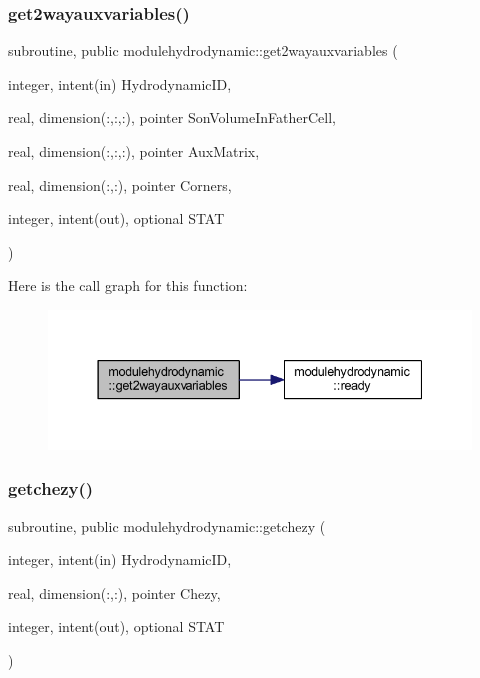 \subsubsection{\texorpdfstring{get2wayauxvariables()}{get2wayauxvariables()}}
{\footnotesize\ttfamily subroutine, public modulehydrodynamic\+::get2wayauxvariables (\begin{DoxyParamCaption}\item[{integer, intent(in)}]{Hydrodynamic\+ID,  }\item[{real, dimension(\+:,\+:,\+:), pointer}]{Son\+Volume\+In\+Father\+Cell,  }\item[{real, dimension(\+:,\+:,\+:), pointer}]{Aux\+Matrix,  }\item[{real, dimension(\+:,\+:), pointer}]{Corners,  }\item[{integer, intent(out), optional}]{S\+T\+AT }\end{DoxyParamCaption})}

Here is the call graph for this function\+:\nopagebreak
\begin{figure}[H]
\begin{center}
\leavevmode
\includegraphics[width=337pt]{namespacemodulehydrodynamic_a64e767d6cd62ef19087fffd022d0ca4a_cgraph}
\end{center}
\end{figure}
\mbox{\label{namespacemodulehydrodynamic_a377c174d00228d8f36d2d1c5e10a7f32}} 
\subsubsection{\texorpdfstring{getchezy()}{getchezy()}}
{\footnotesize\ttfamily subroutine, public modulehydrodynamic\+::getchezy (\begin{DoxyParamCaption}\item[{integer, intent(in)}]{Hydrodynamic\+ID,  }\item[{real, dimension(\+:,\+:), pointer}]{Chezy,  }\item[{integer, intent(out), optional}]{S\+T\+AT }\end{DoxyParamCaption})}

